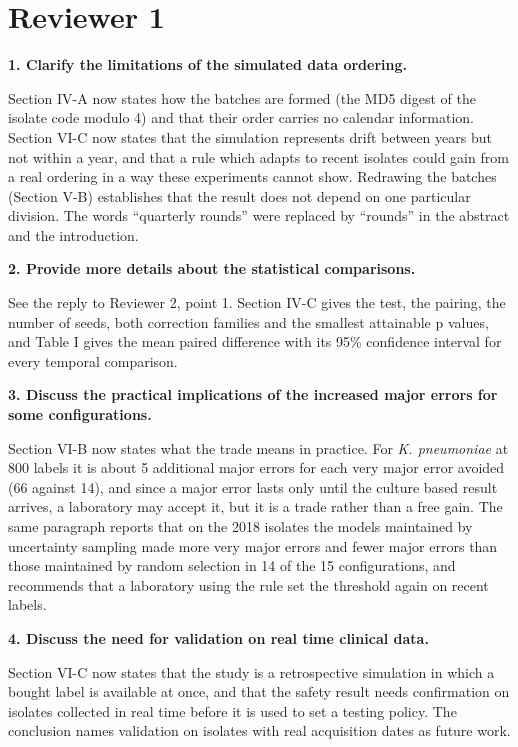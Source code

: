 \documentclass[11pt,a4paper]{article}
\newcommand{\pt}[1]{\textbf{#1}}
\begin{document}
\section*{Reviewer 1}

\pt{1. Clarify the limitations of the simulated data ordering.}

Section IV-A now states how the batches are formed (the MD5 digest of the isolate code modulo 4) and that their order
carries no calendar information. Section VI-C now states that the simulation represents drift between years but not
within a year, and that a rule which adapts to recent isolates could gain from a real ordering in a way these
experiments cannot show. Redrawing the batches (Section V-B) establishes that the result does not depend on one
particular division. The words ``quarterly rounds'' were replaced by ``rounds'' in the abstract and the introduction.

\pt{2. Provide more details about the statistical comparisons.}

See the reply to Reviewer 2, point 1. Section IV-C gives the test, the pairing, the number of seeds, both correction
families and the smallest attainable p values, and Table I gives the mean paired difference with its 95\% confidence
interval for every temporal comparison.

\pt{3. Discuss the practical implications of the increased major errors for some configurations.}

Section VI-B now states what the trade means in practice. For \textit{K. pneumoniae} at 800 labels it is about 5
additional major errors for each very major error avoided (66 against 14), and since a major error lasts only until
the culture based result arrives, a laboratory may accept it, but it is a trade rather than a free gain. The same
paragraph reports that on the 2018 isolates the models maintained by uncertainty sampling made more very major errors
and fewer major errors than those maintained by random selection in 14 of the 15 configurations, and recommends that a
laboratory using the rule set the threshold again on recent labels.

\pt{4. Discuss the need for validation on real time clinical data.}

Section VI-C now states that the study is a retrospective simulation in which a bought label is available at once,
and that the safety result needs confirmation on isolates collected in real time before it is used to set a testing
policy. The conclusion names validation on isolates with real acquisition dates as future work.
\end{document}
